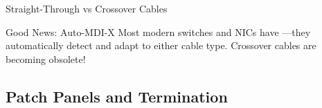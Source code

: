 \documentclass[aspectratio=169]{beamer}  %
\begin{document}
\begin{frame}{Straight-Through vs Crossover Cables}
    \vspace{0.5em}
    \begin{exampleblock}{Good News: Auto-MDI-X}
        Most modern switches and NICs have ---they automatically detect and adapt to either cable type. Crossover cables are becoming obsolete!
    \end{exampleblock}
\end{frame}

\subsection{Patch Panels and Termination}

\end{document}

